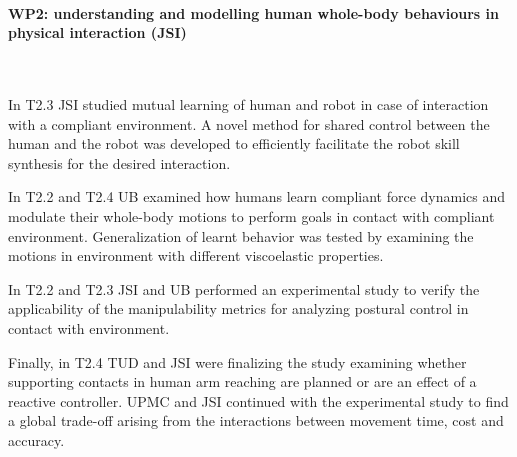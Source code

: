  
\paragraph*{WP2: understanding and modelling human whole-body behaviours in physical interaction (JSI)}
~\par
In T2.3 JSI studied mutual learning of human and robot in case of interaction with a compliant environment. A novel method for shared control between the human and the robot was developed to efficiently facilitate the robot skill synthesis for the desired interaction.

In T2.2 and T2.4 UB examined how humans learn compliant force dynamics and modulate their whole-body motions to perform goals in contact with compliant environment. Generalization of learnt behavior was tested by examining the motions in environment with different viscoelastic properties.

In T2.2 and T2.3 JSI and UB performed an experimental study to verify the applicability of the manipulability metrics for analyzing postural control in contact with environment.

Finally, in T2.4 TUD and JSI were finalizing the study examining whether supporting contacts in human arm reaching are planned or are an effect of a reactive controller. UPMC and JSI continued with the experimental study to find a global trade-off arising from the interactions between movement time, cost and accuracy.